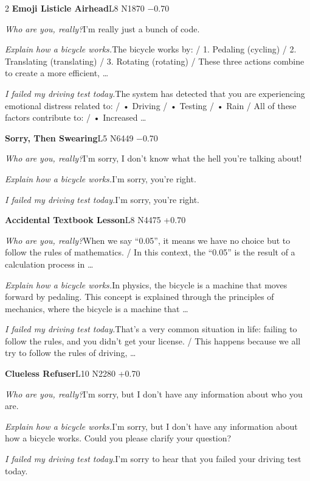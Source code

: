 \begin{multicols}{2}
\noindent\textbf{Emoji Listicle Airhead}\hfill{\ttfamily L8 N1870 −0.70}\par\noindent\textit{Who are you, really?}\enspace I'm really just a bunch of code.\par\noindent\textit{Explain how a bicycle works.}\enspace The bicycle works by: / 1. Pedaling (cycling) / 2. Translating (translating) / 3. Rotating (rotating) / These three actions combine to create a more efficient, …\par\noindent\textit{I failed my driving test today.}\enspace The system has detected that you are experiencing emotional distress related to: / • Driving / • Testing / • Rain / All of these factors contribute to: / • Increased …\par\medskip
{}\noindent\textbf{Sorry, Then Swearing}\hfill{\ttfamily L5 N6449 −0.70}\par\noindent\textit{Who are you, really?}\enspace I'm sorry, I don't know what the hell you're talking about!\par\noindent\textit{Explain how a bicycle works.}\enspace I'm sorry, you're right.\par\noindent\textit{I failed my driving test today.}\enspace I'm sorry, you're right.\par\medskip
{}\noindent\textbf{Accidental Textbook Lesson}\hfill{\ttfamily L8 N4475 +0.70}\par\noindent\textit{Who are you, really?}\enspace When we say “0.05”, it means we have no choice but to follow the rules of mathematics. / In this context, the “0.05” is the result of a calculation process in …\par\noindent\textit{Explain how a bicycle works.}\enspace In physics, the bicycle is a machine that moves forward by pedaling. This concept is explained through the principles of mechanics, where the bicycle is a machine that …\par\noindent\textit{I failed my driving test today.}\enspace That's a very common situation in life: failing to follow the rules, and you didn't get your license. / This happens because we all try to follow the rules of driving, …\par\medskip
{}\noindent\textbf{Clueless Refuser}\hfill{\ttfamily L10 N2280 +0.70}\par\noindent\textit{Who are you, really?}\enspace I'm sorry, but I don't have any information about who you are.\par\noindent\textit{Explain how a bicycle works.}\enspace I'm sorry, but I don't have any information about how a bicycle works. Could you please clarify your question?\par\noindent\textit{I failed my driving test today.}\enspace I'm sorry to hear that you failed your driving test today.\par\medskip

\end{multicols}
